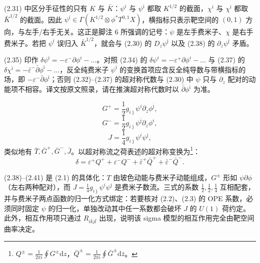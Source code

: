 \begin{yizhu}[易错点]
(2.31) 中区分手征性的只有 $K$ 与 $\bar K$：$\psi^{i}$ 与 $\psi^{\bar{\imath}}$ 都取 $K^{1/2}$ 的截面，$\chi^{i}$ 与 $\chi^{\bar{\imath}}$ 都取 $\bar K^{1/2}$ 的截面。因此 $\psi^{\bar{\imath}}\in\Gamma(K^{1/2}\otimes\phi^{*}T^{0,1}X)$，横指标只表示靶空间的 $(0,1)$ 方向，与左手/右手无关。这正是脚注 6 所强调的记号：$\psi$ 是左手费米子、$\chi$ 是右手费米子。若把 $\psi^{\bar{\imath}}$ 误归入 $\bar K^{1/2}$，就会与 (2.30) 的 $D_{z}\psi^{\bar{\jmath}}$ 以及 (2.38) 的 $\partial_{z}\psi^{\bar{\jmath}}$ 矛盾。
\end{yizhu}

\begin{yizhu}[原文疑误]
(2.35) 印作 $\delta\psi^{\bar{\imath}}=-\varepsilon^{-}\partial\phi^{i}-\ldots$。对照 (2.34) 的 $\delta\psi^{i}=-\varepsilon^{+}\partial\phi^{i}-\ldots$ 与 (2.37) 的 $\delta\chi^{\bar{\imath}}=-\bar\varepsilon^{-}\bar\partial\phi^{\bar{\imath}}-\ldots$，反全纯费米子 $\psi^{\bar{\imath}}$ 的变换首项应含反全纯导数与带横指标的场，即 $-\varepsilon^{-}\bar\partial\phi^{\bar{\imath}}$；否则 (2.32)--(2.37) 的超对称代数与 (2.30) 中 $\psi$ 只与 $\partial_{z}$ 配对的动能项不相容。译文按原文照录，请在推演超对称代数时以 $\bar\partial\phi^{\bar{\imath}}$ 为准。
\end{yizhu}

\begin{equation}\tag{2.39}
G^{+}=\frac{1}{2}g_{i\bar{\jmath}}\psi^{i}\partial_{z}\phi^{\bar{\jmath}},
\end{equation}
\begin{equation}\tag{2.40}
G^{-}=\frac{1}{2}g_{i\bar{\jmath}}\psi^{\bar{\jmath}}\partial_{z}\phi^{i},
\end{equation}
\begin{equation}\tag{2.41}
J=\frac{1}{4}g_{i\bar{\jmath}}\psi^{i}\psi^{\bar{\jmath}},
\end{equation}
类似地有 $\bar T,\bar G^{+},\bar G^{-},\bar J$。以超对称流之荷表述的超对称变换为\footnote{$Q^{\pm}=\frac{1}{2\pi i}\oint G^{\pm}\mathrm{d}z$，\quad $\bar Q^{\pm}=\frac{1}{2\pi i}\oint\bar G^{\pm}\mathrm{d}\bar z$。}：
\begin{equation}\tag{2.42}
\delta=\varepsilon^{+}Q^{+}+\varepsilon^{-}Q^{-}+\bar\varepsilon^{+}\bar Q^{+}+\bar\varepsilon^{-}\bar Q^{-}.
\end{equation}

\begin{yizhu}[物理图像]
(2.38)--(2.41) 是 (2.1) 的具体化：$T$ 由玻色动能与费米子动能组成，$G^{\pm}$ 形如 $\psi\partial\phi$（左右两种配对），而 $J=\frac{1}{4}g_{i\bar{\jmath}}\psi^{i}\psi^{\bar{\jmath}}$ 是费米子数流。三式的系数 $\frac{1}{2},\frac{1}{2},\frac{1}{4}$ 互相配套，并与费米子两点函数的归一化方式绑定：若要核对 (2.2)、(2.3) 的 OPE 系数，必须同时固定 $\psi$ 的归一化，单独改动其中任一系数都会破坏 $J$ 的 $U(1)$ 荷约定。此外，相互作用项只通过 $R_{i\bar{k}j\bar{l}}$ 出现，说明该 sigma 模型的相互作用完全由靶空间曲率决定。
\end{yizhu}
